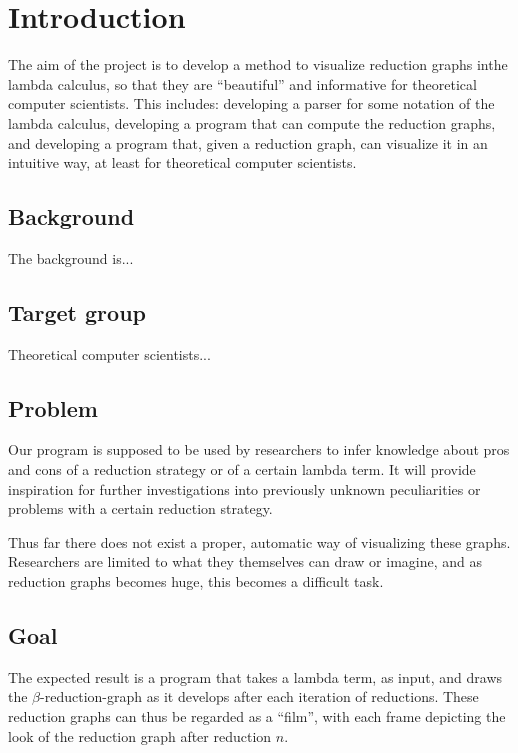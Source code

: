 
\chapter{Introduction}
The aim of the project is to develop a method to visualize reduction graphs
inthe lambda calculus, so that they are ``beautiful'' and informative for
theoretical computer scientists. This includes: developing a parser for some
notation of the lambda calculus, developing a program that can compute the
reduction graphs, and developing a program that, given a reduction graph, can
visualize it in an intuitive way, at least for theoretical computer
scientists.

\section{Background}
The background is...

\section{Target group}
Theoretical computer scientists...

\section{Problem}
Our program is supposed to be used by researchers to infer knowledge about
pros and cons of a reduction strategy or of a certain lambda term. It will
provide inspiration for further investigations into previously unknown
peculiarities or problems with a certain reduction strategy.

Thus far there does not exist a proper, automatic way of visualizing these
graphs. Researchers are limited to what they themselves can draw or imagine,
and as reduction graphs becomes huge, this becomes a difficult task.

\section{Goal}
The expected result is a program that takes a lambda term, as input, and draws
the $\beta$-reduction-graph as it develops after each iteration of reductions.
These reduction graphs can thus be regarded as a ``film'', with each frame
depicting the look of the reduction graph after reduction $n$.


